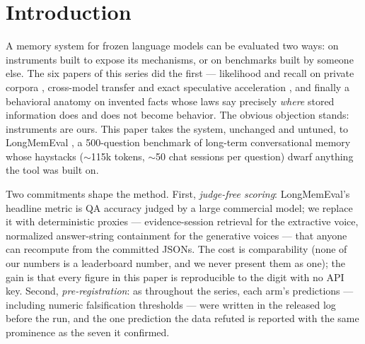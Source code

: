 \documentclass[11pt]{article}
\begin{document}
\section{Introduction}

A memory system for frozen language models can be evaluated two ways: on instruments built to expose its mechanisms, or on benchmarks built by someone else. The six papers of this series did the first --- likelihood and recall on private corpora \cite{sillage,router,hier,fw}, cross-model transfer and exact speculative acceleration \cite{drafter}, and finally a behavioral anatomy on invented facts \cite{behavior} whose laws say precisely \emph{where} stored information does and does not become behavior. The obvious objection stands: instruments are ours. This paper takes the system, unchanged and untuned, to LongMemEval \cite{longmemeval}, a 500-question benchmark of long-term conversational memory whose haystacks ($\sim$115k tokens, $\sim$50 chat sessions per question) dwarf anything the tool was built on.

Two commitments shape the method. First, \emph{judge-free scoring}: LongMemEval's headline metric is QA accuracy judged by a large commercial model; we replace it with deterministic proxies --- evidence-session retrieval for the extractive voice, normalized answer-string containment for the generative voices --- that anyone can recompute from the committed JSONs. The cost is comparability (none of our numbers is a leaderboard number, and we never present them as one); the gain is that every figure in this paper is reproducible to the digit with no API key. Second, \emph{pre-registration}: as throughout the series, each arm's predictions --- including numeric falsification thresholds --- were written in the released log before the run, and the one prediction the data refuted is reported with the same prominence as the seven it confirmed.
\end{document}
